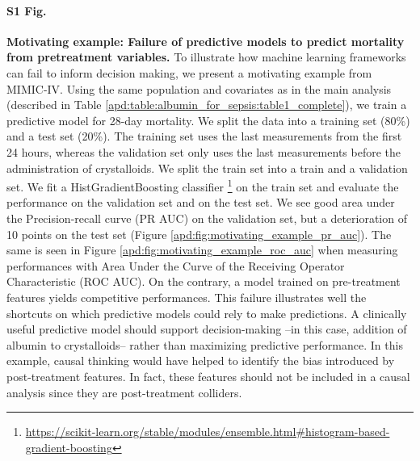 \documentclass[10pt,letterpaper]{article}
\begin{document}
\paragraph*{S1 Fig.}
\label{apd:motivating_example}
{\bf Motivating example: Failure of predictive models to predict mortality
    from pretreatment variables.}
To illustrate how machine learning frameworks can fail to inform decision
making, we present a motivating example from MIMIC-IV. Using the same
population and covariates as in the main analysis (described in Table
\ref{apd:table:albumin_for_sepsis:table1_complete}), we train a predictive
model for 28-day mortality. We split the data into a training set (80\%) and a
test set (20\%). The training set uses the last measurements from the first 24
hours, whereas the validation set only uses the last measurements before the
administration of crystalloids. We split the train set into a train and a
validation set. We fit a HistGradientBoosting classifier
\footnote{\url{https://scikit-learn.org/stable/modules/ensemble.html\#histogram-based-gradient-boosting}}
on the train set and evaluate the performance on the validation set and on the
test set. We see good area under the Precision-recall curve (PR AUC) on the
validation set, but a deterioration of 10 points on the test set (Figure
\ref{apd:fig:motivating_example_pr_auc}). The same is seen in Figure
\ref{apd:fig:motivating_example_roc_auc} when measuring performances with Area
Under the Curve of the Receiving Operator Characteristic (ROC AUC). On the
contrary, a model trained on pre-treatment features yields competitive
performances. This failure illustrates well the shortcuts on which predictive
models could rely to make predictions. A clinically useful predictive model
should support decision-making --in this case, addition of albumin to
crystalloids-- rather than maximizing predictive performance. In this example,
causal thinking would have helped to identify the bias introduced by
post-treatment features. In fact, these features should not be included in a
causal analysis since they are post-treatment colliders.
\end{document}
